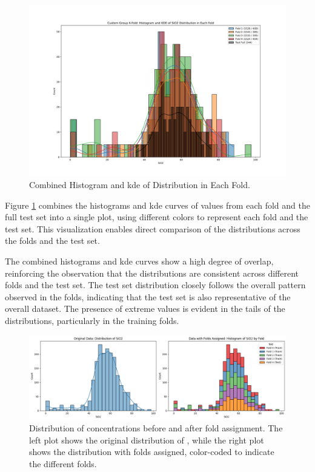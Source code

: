 \begin{figure}[h!]
    \centering
    \includegraphics[width=\textwidth]{images/histogram_kde_plot.png}
    \caption{Combined Histogram and \gls{kde} of  Distribution in Each Fold.}
    \label{fig:histogram_kde_plot}
\end{figure}

Figure \ref{fig:histogram_kde_plot} combines the histograms and \gls{kde} curves of  values from each fold and the full test set into a single plot, using different colors to represent each fold and the test set.
This visualization enables direct comparison of the distributions across the folds and the test set.

The combined histograms and \gls{kde} curves show a high degree of overlap, reinforcing the observation that the distributions are consistent across different folds and the test set.
The test set distribution closely follows the overall pattern observed in the folds, indicating that the test set is also representative of the overall dataset.
The presence of extreme values is evident in the tails of the distributions, particularly in the training folds.

\begin{figure}[h!]
    \centering
    \includegraphics[width=\textwidth]{images/original_and_post_fold.png}
    \caption{Distribution of  concentrations before and after fold assignment. The left plot shows the original distribution of , while the right plot shows the distribution with folds assigned, color-coded to indicate the different folds.}
    \label{fig:original_and_post_fold_plot}
\end{figure}

